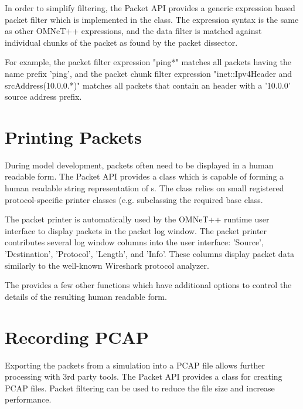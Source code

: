 In order to simplify filtering, the Packet API provides a generic expression
based packet filter which is implemented in the  class.
The expression syntax is the same as other OMNeT++ expressions, and the data
filter is matched against individual chunks of the packet as found by the packet
dissector.

For example, the packet filter expression "ping*" matches all packets having the
name prefix 'ping', and the packet chunk filter expression "inet::Ipv4Header and
srcAddress(10.0.0.*)" matches all packets that contain an  header
with a '10.0.0' source address prefix.


\section{Printing Packets}

During model development, packets often need to be displayed in a human readable
form. The Packet API provides a  class which is capable
of forming a human readable string representation of s. The
 class relies on small registered protocol-specific
printer classes (e.g.  subclassing the required
 base class.

The packet printer is automatically used by the OMNeT++ runtime user interface
to display packets in the packet log window. The packet printer contributes
several log window columns into the user interface: 'Source', 'Destination',
'Protocol', 'Length', and 'Info'. These columns display packet data similarly to
the well-known Wireshark protocol analyzer.


The  provides a few other functions which have
additional options to control the details of the resulting human readable form.

\section{Recording PCAP}

Exporting the packets from a simulation into a PCAP file allows further
processing with 3rd party tools. The Packet API provides a 
class for creating PCAP files. Packet filtering can be used to reduce the file
size and increase performance.

